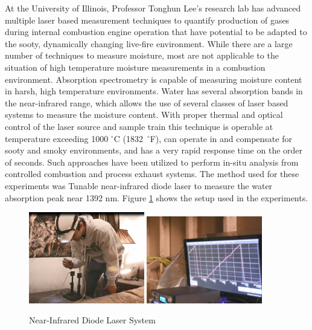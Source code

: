 \documentclass[12pt,oneside]{book}
\begin{document}
At the University of Illinois, Professor Tonghun Lee's research lab has advanced multiple laser based measurement techniques to quantify production of gases during internal combustion engine operation that have potential to be adapted to the sooty, dynamically changing live-fire environment. While there are a large number of techniques to measure moisture, most are not applicable to the situation of high temperature moisture measurements in a combustion environment.  Absorption spectrometry is capable of measuring moisture content in harsh, high temperature environments.  Water has several absorption bands in the near-infrared range, which allows the use of several classes of laser based systems to measure the moisture content.  With proper thermal and optical control of the laser source and sample train this technique is operable at temperature exceeding 1000 $^\circ$C (1832~$^\circ$F), can operate in and compensate for sooty and smoky environments, and has a very rapid response time on the order of seconds.  Such approaches have been utilized to perform in-situ analysis from controlled combustion and process exhaust systems.  The method used for these experiments was Tunable near-infrared diode laser to measure the water absorption peak near 1392 nm. Figure \ref{fig:Laser} shows the setup used in the experiments.

\begin{figure}[H]
	\centering
	\includegraphics[width = 0.45\textwidth]{0_Images/Instrumentation/Laser1}
	\includegraphics[width = 0.45\textwidth]{0_Images/Instrumentation/Laser2}
	\caption{Near-Infrared Diode Laser System}
	\label{fig:Laser}
\end{figure}
\end{document}
